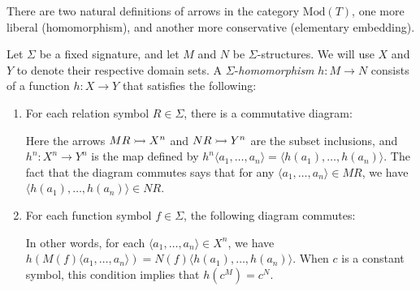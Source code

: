 There are two natural definitions of arrows in the category
$\mathrm{Mod}(T)$, one more liberal (homomorphism), and another more
conservative (elementary embedding).

\begin{defn} Let $\Sigma$ be a fixed signature, and let $M$ and $N$ be
  $\Sigma$-structures.  We will use $X$ and $Y$ to denote their
  respective domain sets.  A $\Sigma$-\emph{homomorphism} $h:M\to N$
  consists of a function $h:X\to Y$ that satisfies the following:
  \begin{enumerate}
  \item For each relation symbol $R\in \Sigma$, there is a commutative
    diagram:


\noindent Here the arrows $MR\rightarrowtail X^n$ and $NR\rightarrowtail Y^n$ are the
subset inclusions, and $h^n:X^n\to Y^n$ is the map defined by
$h^n\langle a_1,\dots ,a_n\rangle =\langle h(a_1),\dots
,h(a_n)\rangle$.  The fact that the diagram commutes says that for any
$\langle a_1,\dots ,a_n\rangle \in MR$, we have
$\langle h(a_1),\dots ,h(a_n)\rangle\in NR$.
 
\item For each function symbol $f\in \Sigma$, the following diagram
  commutes:


  \noindent In other words, for each
  $\langle a_1,\dots ,a_n\rangle\in X^n$, we have
  $h(M(f)\langle a_1,\dots ,a_n\rangle)=N(f)\langle h(a_1),\dots
  ,h(a_n)\rangle$.  When $c$ is a constant symbol, this condition
  implies that $h(c^M)=c^N$.
\end{enumerate}
\end{defn}




